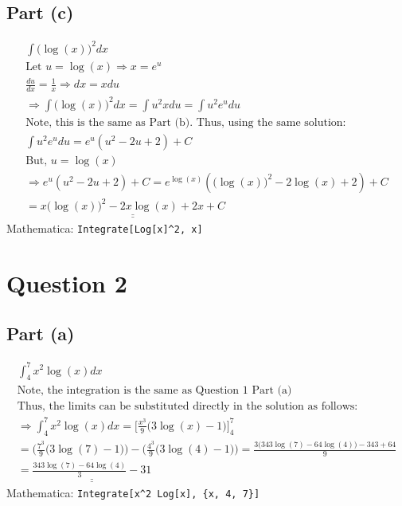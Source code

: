 \documentclass[letterpaper,10pt]{article}
\newcommand{\doubleu}[1]{\underline{\underline{#1}}}
\newcommand{\mathematica}[1]{Mathematica: \texttt{#1}}
\begin{document}
		\subsection{Part (c)}
			\begin{gather*}
				\int \Big(\log (x) \Big) ^2 dx \\
				\text {Let } u = \log (x)
				\Rightarrow x = e^u \\
				\frac{du}{dx} = \frac{1}{x}
				\Rightarrow dx = xdu \\
				\Rightarrow \int \Big( \log (x) \Big) ^2 dx
				= \int u^2 x du
				= \int u^2 e^u du \\
				\text{Note, this is the same as Part (b). Thus, using the same solution:}\\
				\int u^2 e^u du = e^u (u^2 -2u +2) + C \\
				\text{But, } u = \log(x) \\
				\Rightarrow e^u (u^2 -2u +2) + C
				= e^{\log(x)} (\big(\log(x)\big)^2 - 2\log(x) + 2) + C \\
				= \doubleu{x\big(\log(x)\big)^2 -2x\log(x) + 2x + C}
			\end{gather*}
			\mathematica{Integrate[Log[x]\^{}2, x]}


	\section{Question 2}
		\subsection{Part (a)}
			\begin{gather*}
				\int_{4}^7 x^2 \log(x) dx \\
				\text{Note, the integration is the same as Question 1 Part (a)} \\
				\text{Thus, the limits can be substituted directly in the solution as follows:} \\
				\Rightarrow \int_{4}^7 x^2 \log(x) dx = \Bigg[ \frac{x^3}{9} \bigg( 3\log(x) - 1 \bigg) \Bigg]_{4}^{7} \\
				= \bigg( \frac{7^3}{9} \Big( 3\log(7) - 1 \Big) \bigg) - \bigg( \frac{4^3}{9} \Big( 3\log(4) -1 \Big) \bigg) = \frac{3 \big( 343\log(7) - 64\log(4) \big) - 343 + 64}{9} \\
				= \doubleu{\frac{343\log(7)-64\log(4)}{3} - 31}
			\end{gather*}
			\mathematica{Integrate[x\^{}2 Log[x], \{x, 4, 7\}]}
			\newpage
\end{document}
